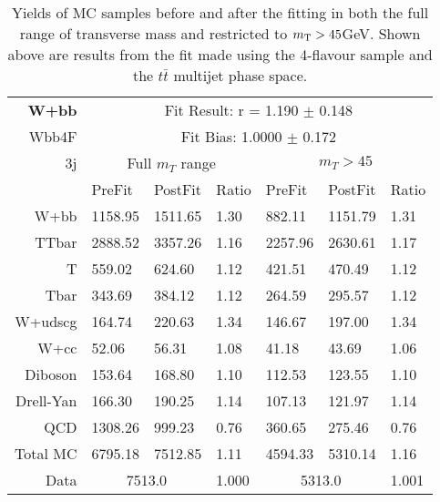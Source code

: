 \begin{table}[htb]
\begin{center}
\begin{tabular}{r|l|l|l|l|l|l}
\bf{W+bb} & \multicolumn{6}{c}{Fit Result: r = 1.190 $\pm$ 0.148}\\ 
Wbb4F & \multicolumn{6}{c}{Fit Bias: 1.0000 $\pm$ 0.172}\\ 
3j & \multicolumn{3}{c}{Full $m_T$ range} & \multicolumn{3}{c}{$m_T>45$}\\ 
{} & PreFit & PostFit & Ratio & PreFit & PostFit & Ratio \\ \hline 
W+bb  &	 1158.95 &	 1511.65 &	 1.30 &	 882.11 &	 1151.79 &	 1.31\\ 
TTbar  &	 2888.52 &	 3357.26 &	 1.16 &	 2257.96 &	 2630.61 &	 1.17\\ 
T  &	 559.02 &	 624.60 &	 1.12 &	 421.51 &	 470.49 &	 1.12\\ 
Tbar  &	 343.69 &	 384.12 &	 1.12 &	 264.59 &	 295.57 &	 1.12\\ 
W+udscg  &	 164.74 &	 220.63 &	 1.34 &	 146.67 &	 197.00 &	 1.34\\ 
W+cc  &	 52.06 &	 56.31 &	 1.08 &	 41.18 &	 43.69 &	 1.06\\ 
Diboson  &	 153.64 &	 168.80 &	 1.10 &	 112.53 &	 123.55 &	 1.10\\ 
Drell-Yan  &	 166.30 &	 190.25 &	 1.14 &	 107.13 &	 121.97 &	 1.14\\ 
QCD  &	 1308.26 &	 999.23 &	 0.76 &	 360.65 &	 275.46 &	 0.76\\ 
Total MC  &	 6795.18 &	 7512.85 &	 1.11 &	 4594.33 &	 5310.14 &	 1.16\\ 
\hline \hline 
Data & \multicolumn{2}{c|}{7513.0} & 1.000 & \multicolumn{2}{c|}{5313.0} & 1.001 
\end{tabular}
\caption{
 Yields of MC samples before and after the fitting
  in both the full range of transverse mass and restricted 
  to $m_\mathrm{T}>45$GeV.
 Shown above are results from the fit made using the 4-flavour \Wbb sample and the
  $t\bar{t}$ multijet phase space.}
\label{tab:fitYields_4F_3j}
\end{center}
\end{table}

